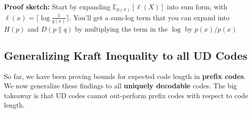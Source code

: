 \documentclass[a4paper,12pt]{report}
\begin{document}
\textbf{Proof sketch:} Start by expanding $\mathbb E_{p(x)} [\ell(X)]$ into sum form,
with $\ell(x) = \lceil \log \frac 1 {q(x)} \rceil$. You'll get a sum-log term
that you can expand into $H(p)$ and $D(p\|q)$ by multiplying the term in the
$\log$ by $p(x)/p(x)$ \qedsymbol{}



\subsection{Generalizing Kraft Inequality to all UD Codes}

So far, we have been proving bounds for expected code length in \textbf{prefix
codes}. We now generalize these findings to all \textbf{uniquely decodable}
codes. The big takeaway is that UD codes cannot out-perform prefix codes with
respect to code length. 
\end{document}
